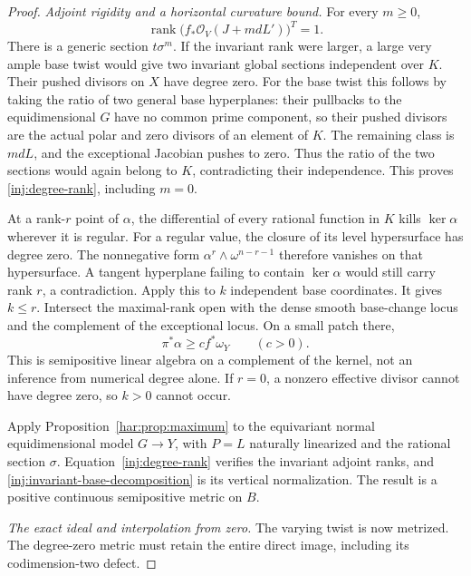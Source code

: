 \begin{proof}
\smallskip\noindent\textit{Adjoint rigidity and a horizontal curvature bound.}
For every $m\ge0$,
\begin{equation}\label{inj:degree-rank}
 \operatorname{rank}
 \bigl(f_*\mathcal O_V(J+mdL')\bigr)^T=1.
\end{equation}
There is a generic section $t\sigma^m$.  If the invariant rank
were larger, a large very ample base twist would give two invariant
global sections independent over $K$.  Their pushed divisors on $X$
have degree zero.  For the base twist this follows by taking the
ratio of two general base hyperplanes: their pullbacks to the
equidimensional $G$ have no common prime component, so their pushed
divisors are the actual polar and zero divisors of an element of
$K$.  The remaining class is $mdL$, and the exceptional Jacobian
pushes to zero.  Thus the ratio of the two sections would again
belong to $K$, contradicting their independence.  This proves
\eqref{inj:degree-rank}, including $m=0$.

At a rank-$r$ point of $\alpha$, the differential of every rational
function in $K$ kills $\ker\alpha$ wherever it is regular.
For a regular value, the closure of its level hypersurface has
degree zero.  The nonnegative form
$\alpha^r\wedge\omega^{n-r-1}$ therefore vanishes on that
hypersurface.  A tangent hyperplane failing to contain $\ker\alpha$
would still carry rank $r$, a contradiction.  Apply this to $k$
independent base coordinates. It gives $k\le r$. Intersect the
maximal-rank open with the dense smooth base-change locus and the
complement of the exceptional locus. On a small patch there,
\begin{equation}\label{inj:horizontal-patch}
 \pi^*\alpha\ge c f^*\omega_Y\qquad(c>0).
\end{equation}
This is semipositive linear algebra on a complement of the kernel,
not an inference from numerical degree alone.  If $r=0$, a nonzero
effective divisor cannot have degree zero, so $k>0$ cannot occur.

Apply Proposition~\ref{har:prop:maximum} to the equivariant normal equidimensional model $G\to Y$, with $P=L$ naturally linearized and the rational section $\sigma$. Equation~\eqref{inj:degree-rank} verifies the invariant adjoint ranks, and \eqref{inj:invariant-base-decomposition} is its vertical normalization. The result is a positive continuous semipositive metric on $B$.

\smallskip\noindent\textit{The exact ideal and interpolation from zero.}
The varying twist is now metrized. The degree-zero metric must retain
the entire direct image, including its codimension-two defect.


\end{proof}
